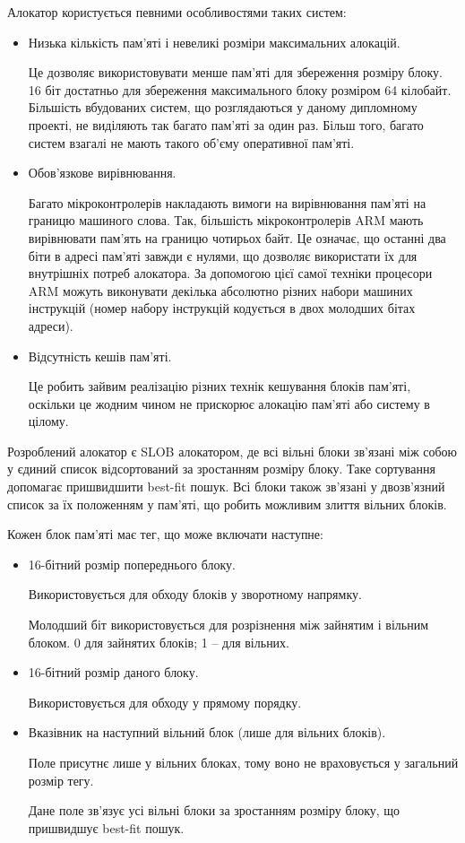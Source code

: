 \documentclass[oneside,14pt,a4paper,final]{myextreport}
\begin{document}
Алокатор користується певними особливостями таких систем:
\begin{itemize}
\item Низька кількість пам'яті і невеликі розміри максимальних алокацій.

  Це дозволяє використовувати менше пам'яті для збереження розміру блоку. 16 біт достатньо для збереження максимального блоку розміром 64 кілобайт. Більшість вбудованих систем, що розглядаються у даному дипломному проекті, не виділяють так багато пам'яті за один раз. Більш того, багато систем взагалі не мають такого об'єму оперативної пам'яті.

\item Обов'язкове вирівнювання.

  Багато мікроконтролерів накладають вимоги на вирівнювання пам'яті на границю машиного слова. Так, більшість мікроконтролерів ARM мають вирівнювати пам'ять на границю чотирьох байт. Це означає, що останні два біти в адресі пам'яті завжди є нулями, що дозволяє використати їх для внутрішніх потреб алокатора. За допомогою цієї самої техніки процесори ARM можуть виконувати декілька абсолютно різних набори машиних інструкцій (номер набору інструкцій кодується в двох молодших бітах адреси).

\item Відсутність кешів пам'яті.

  Це робить зайвим реалізацію різних технік кешування блоків пам'яті, оскільки це жодним чином не прискорює алокацію пам'яті або систему в цілому.
\end{itemize}

Розроблений алокатор є \acs{SLOB} алокатором, де всі вільні блоки зв'язані між собою у єдиний список відсортований за зростанням розміру блоку. Таке сортування допомагає пришвидшити best-fit пошук. Всі блоки також зв'язані у двозв'язний список за їх положенням у пам'яті, що робить можливим злиття вільних блоків.

Кожен блок пам'яті має тег, що може включати наступне:

\begin{itemize}
\item 16-бітний розмір попереднього блоку.

  Використовується для обходу блоків у зворотному напрямку.

  Молодший біт використовується для розрізнення між зайнятим і вільним блоком. 0 для зайнятих блоків; 1 -- для вільних.

\item 16-бітний розмір даного блоку.

  Використовується для обходу у прямому порядку.

\item Вказівник на наступний вільний блок (лише для вільних блоків).

  Поле присутнє лише у вільних блоках, тому воно не враховується у загальний розмір тегу.

  Дане поле зв'язує усі вільні блоки за зростанням розміру блоку, що пришвидшує best-fit пошук.
\end{itemize}
\end{document}
